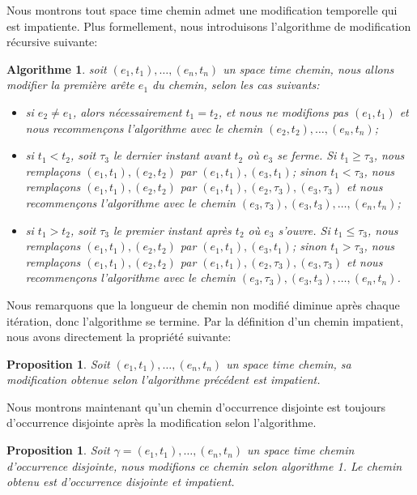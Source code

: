 \documentclass[titlepage,a4paper,12pt]{article}
\newcounter{thm}
\newcounter{prop}
\newcounter{algo}
\newtheorem{algoimp}[algo]{Algorithme}
\newtheorem{modifimp}[prop]{Proposition}
\newtheorem{modocdis}[prop]{Proposition}
\begin{document}
Nous montrons tout space time chemin admet une modification temporelle qui est impatiente. Plus formellement, nous introduisons l'algorithme de modification récursive suivante:
\begin{algoimp} soit $(e_1,t_1),\dots,(e_n,t_n)$ un space time chemin, nous allons modifier la première arête $e_1$ du chemin, selon les cas suivants:
\begin{itemize}[label = $\bullet$, leftmargin = *]
\item si $e_2 \neq e_1$, alors nécessairement $t_1 = t_2$, et nous ne modifions pas $(e_1,t_1)$ et nous recommençons l'algorithme avec le chemin $(e_2,t_2),\dots,(e_n,t_n)$;
\item  si $t_1< t_2$, soit $\tau_3$ le dernier instant avant $t_2$ où $e_{3}$ se ferme. Si $t_1 \geqslant \tau_3$, nous remplaçons $(e_1,t_1),(e_2,t_2)$ par $(e_1,t_1),(e_3,t_1)$; sinon $t_1 < \tau_3$, nous remplaçons $(e_1,t_1),(e_2,t_2)$ par $(e_1,t_1),(e_2,\tau_3),(e_3,\tau_3)$ et nous recommençons l'algorithme avec le chemin $(e_3,\tau_3),(e_3,t_3),\dots,(e_n,t_n)$;
\item si $t_1 > t_2$, soit $\tau_3$ le premier instant après $t_2$ où $e_{3}$ s'ouvre. Si $t_1 \leqslant \tau_3$, nous remplaçons $(e_1,t_1),(e_2,t_2)$ par $(e_1,t_1),(e_3,t_1)$; sinon $t_1 > \tau_3$, nous remplaçons $(e_1,t_1),(e_2,t_2)$ par $(e_1,t_1),(e_2,\tau_3),(e_3,\tau_3)$ et nous recommençons l'algorithme avec le chemin $(e_3,\tau_3),(e_3,t_3),\dots,(e_n,t_n)$.
\end{itemize}
\end{algoimp}
Nous remarquons que la longueur de chemin non modifié diminue après chaque itération, donc l'algorithme se termine. Par la définition d'un chemin impatient, nous avons directement la propriété suivante:
\begin{modifimp}
Soit $(e_1,t_1),\dots,(e_n,t_n)$ un space time chemin, sa modification obtenue selon l'algorithme précédent est impatient.
\end{modifimp}
Nous montrons maintenant qu'un chemin d'occurrence disjointe est toujours d'occurrence disjointe après la modification selon l'algorithme.
\begin{modocdis} Soit $\gamma = (e_1,t_1),\dots,(e_n,t_n)$ un space time chemin d'occurrence disjointe, nous modifions ce chemin selon algorithme 1. Le chemin obtenu est d'occurrence disjointe et impatient.
\end{modocdis}
\end{document}
